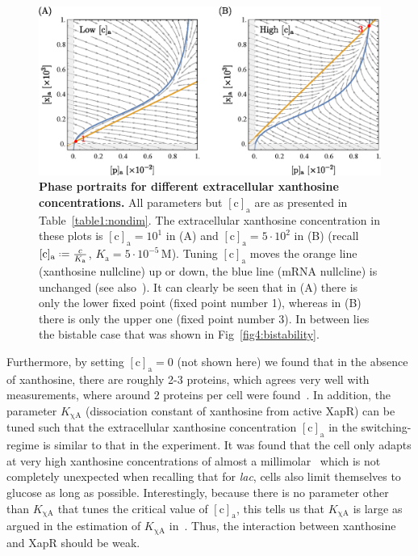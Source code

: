 \documentclass[10pt,letterpaper]{article}
\newcommand{\unit}[1]{\,\mathrm{#1}}
\newcommand{\n}[1]{\mathrm{#1}}
\newcommand*{\defeq}{\mathrel{\vcenter{\baselineskip0.5ex \lineskiplimit0pt
			\hbox{\scriptsize.}\hbox{\scriptsize.}}}%
	=}
\begin{document}
\begin{figure}%
	\centering
	\includegraphics[width=1\textwidth]{media/VaryingC.eps}
	\caption{{\bf Phase portraits for different extracellular xanthosine concentrations.}
		All parameters but $\n{[c]_a}$ are as presented in
		Table~\ref{table1:nondim}. The extracellular xanthosine
		concentration in these plots is $\n{[c]_a}=10^{1}$ in (A) and
		$\n{[c]_a}= 5 \cdot 10^{2}$ in (B) (recall $\n{[c]_{a}} \defeq
		\frac{c}{K_{\n{a}}}$, $K_{\n{a}} = 5 \cdot 10^{-5} \unit{M}$).
		Tuning $\n{[c]_a}$ moves the orange line (xanthosine nullcline) up
		or down, the blue line (mRNA nullcline) is unchanged (see
		also~). It can clearly be seen that in (A) there is
		only the lower fixed point (fixed point number 1), whereas in (B)
		there is only the upper one (fixed point number 3). In between lies
		the bistable case that was shown in Fig~\ref{fig4:bistability}.}
	\label{fig5:extraxanth}
\end{figure}

Furthermore, by setting $\n{[c]_a}=0$ (not shown here) we found that in the
absence of xanthosine, there are roughly 2-3 proteins, which agrees very
well with measurements, where around 2 proteins per cell were
found~\cite{Li2014}. In addition, the parameter $K_{\n{\chi A}}$
(dissociation constant of xanthosine from active XapR) can be tuned such
that the extracellular xanthosine concentration $\n{[c]_a}$ in the
switching-regime is similar to that in the experiment. It was found that the
cell only adapts at very high xanthosine concentrations of almost a
millimolar~\cite{Norholm2001} which is not completely unexpected when
recalling that for \emph{lac}, cells also limit themselves to glucose as
long as possible. Interestingly, because there is no parameter other than
$K_{\n{\chi A}}$ that tunes the critical value of $\n{[c]_a}$, this tells us
that $K_{\n{\chi A}}$ is large as argued in the estimation of $K_{\n{\chi
A}}$ in~. Thus, the interaction between xanthosine and XapR
should be weak.
\end{document}
